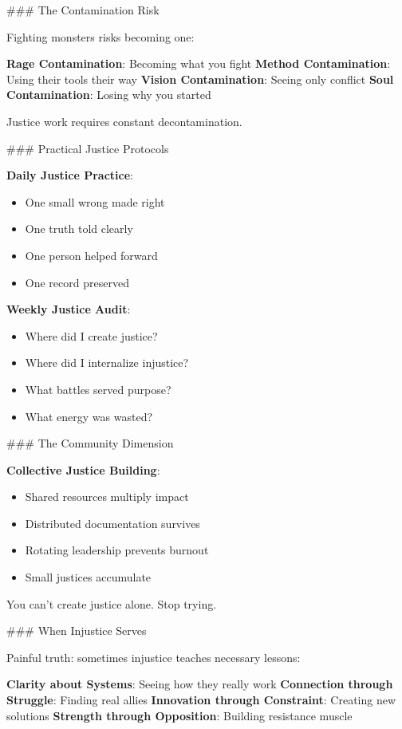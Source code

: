 \documentclass[12pt]{book}
\begin{document}
\#\#\# The Contamination Risk

Fighting monsters risks becoming one:

\textbf{Rage Contamination}: Becoming what you fight
\textbf{Method Contamination}: Using their tools their way
\textbf{Vision Contamination}: Seeing only conflict
\textbf{Soul Contamination}: Losing why you started

Justice work requires constant decontamination.

\#\#\# Practical Justice Protocols

\textbf{Daily Justice Practice}:
\begin{itemize}
\item One small wrong made right
\item One truth told clearly
\item One person helped forward
\item One record preserved

\end{itemize}
\textbf{Weekly Justice Audit}:
\begin{itemize}
\item Where did I create justice?
\item Where did I internalize injustice?
\item What battles served purpose?
\item What energy was wasted?

\end{itemize}
\#\#\# The Community Dimension

\textbf{Collective Justice Building}:
\begin{itemize}
\item Shared resources multiply impact
\item Distributed documentation survives
\item Rotating leadership prevents burnout
\item Small justices accumulate

\end{itemize}
You can't create justice alone. Stop trying.

\#\#\# When Injustice Serves

Painful truth: sometimes injustice teaches necessary lessons:

\textbf{Clarity about Systems}: Seeing how they really work
\textbf{Connection through Struggle}: Finding real allies
\textbf{Innovation through Constraint}: Creating new solutions
\textbf{Strength through Opposition}: Building resistance muscle
\end{document}
